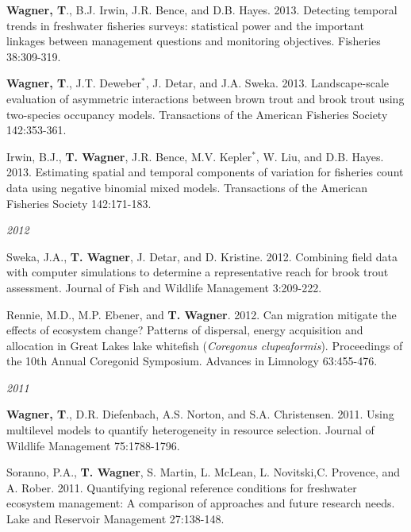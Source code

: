 \documentclass[10pt]{article}
\begin{document}
\begin{flushleft}
\begin{etaremune}[start=28]
\item {\bf Wagner, T}., B.J. Irwin, J.R. Bence, and D.B. Hayes. 2013. Detecting temporal trends in freshwater fisheries surveys: statistical power and the important linkages between management questions and monitoring objectives. Fisheries 38:309-319.

\item {\bf Wagner, T}., J.T. Deweber$^*$, J. Detar, and J.A. Sweka. 2013. Landscape-scale evaluation of asymmetric interactions between brown trout and brook trout using two-species occupancy models. Transactions of the American Fisheries Society 142:353-361.

\item Irwin, B.J., {\bf T. Wagner}, J.R. Bence, M.V. Kepler$^*$, W. Liu, and D.B. Hayes. 2013. Estimating spatial and temporal components of variation for fisheries count data using negative binomial mixed models. Transactions of the American Fisheries Society 142:171-183.

\end{etaremune}
\emph{2012}
\begin{etaremune}[start=24]
\item Sweka, J.A., {\bf T. Wagner}, J. Detar, and D. Kristine. 2012. Combining field data with computer simulations to determine a representative reach for brook trout assessment. Journal of Fish and Wildlife Management 3:209-222.

\item Rennie, M.D., M.P. Ebener, and {\bf T. Wagner}. 2012. Can migration mitigate the effects of ecosystem change? Patterns of dispersal, energy acquisition and allocation in Great Lakes lake whitefish (\emph{Coregonus clupeaformis}). Proceedings of the 10th Annual Coregonid Symposium. Advances in Limnology 63:455-476. 

\end{etaremune}
\emph{2011}
\begin{etaremune}[start=22]
\item {\bf Wagner, T}., D.R. Diefenbach, A.S. Norton, and S.A. Christensen. 2011. Using multilevel models to quantify heterogeneity in resource selection. Journal of Wildlife Management 75:1788-1796. 

\item Soranno, P.A., {\bf T. Wagner}, S. Martin, L. McLean, L. Novitski,C. Provence, and A. Rober. 2011. Quantifying regional reference conditions for freshwater ecosystem management: A comparison of approaches and future research needs. Lake and Reservoir Management 27:138-148. 


\end{etaremune}
\end{flushleft}
\end{document}
